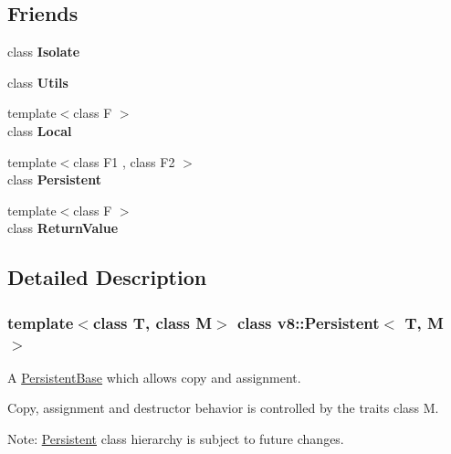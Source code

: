 \subsection*{Friends}
\begin{DoxyCompactItemize}
\item 
\mbox{\label{classv8_1_1Persistent_aba4f0964bdacf2bbf62cf876e5d28d0a}} 
class {\bfseries Isolate}
\item 
\mbox{\label{classv8_1_1Persistent_abc0f7da619e9e72510dc07ed7b5ff6d8}} 
class {\bfseries Utils}
\item 
\mbox{\label{classv8_1_1Persistent_afb872edb4aac7ba55f0da004113aa2b0}} 
{\footnotesize template$<$class F $>$ }\\class {\bfseries Local}
\item 
\mbox{\label{classv8_1_1Persistent_ad845ec8872174be0a9ca9a3dd1898d30}} 
{\footnotesize template$<$class F1 , class F2 $>$ }\\class {\bfseries Persistent}
\item 
\mbox{\label{classv8_1_1Persistent_a53f604d3d6f2dc0647df33c9979f116a}} 
{\footnotesize template$<$class F $>$ }\\class {\bfseries Return\+Value}
\end{DoxyCompactItemize}


\subsection{Detailed Description}
\subsubsection*{template$<$class T, class M$>$\newline
class v8\+::\+Persistent$<$ T, M $>$}

A \mbox{\hyperlink{classv8_1_1PersistentBase}{Persistent\+Base}} which allows copy and assignment.

Copy, assignment and destructor behavior is controlled by the traits class M.

Note\+: \mbox{\hyperlink{classv8_1_1Persistent}{Persistent}} class hierarchy is subject to future changes. 

